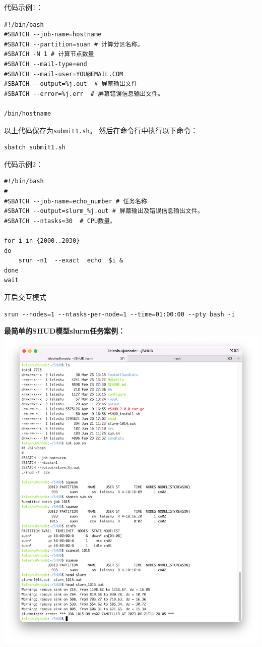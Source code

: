 \documentclass[
]{ctexbook}
\begin{document}
代码示例1：

\begin{verbatim}
#!/bin/bash
#SBATCH --job-name=hostname
#SBATCH --partition=suan # 计算分区名称。
#SBATCH -N 1 # 计算节点数量
#SBATCH --mail-type=end  
#SBATCH --mail-user=YOU@EMAIL.COM
#SBATCH --output=%j.out  # 屏幕输出文件
#SBATCH --error=%j.err  # 屏幕错误信息输出文件。

/bin/hostname
\end{verbatim}

以上代码保存为\texttt{submit1.sh}。 然后在命令行中执行以下命令：

\begin{verbatim}
sbatch submit1.sh
\end{verbatim}

代码示例2：

\begin{verbatim}
#!/bin/bash
#
#SBATCH --job-name=echo_number # 任务名称
#SBATCH --output=slurm_%j.out # 屏幕输出及错误信息输出文件。
#SBATCH --ntasks=30  # CPU数量。

for i in {2000..2030}
do
    srun -n1  --exact  echo  $i &
done
wait
\end{verbatim}

开启交互模式

\begin{verbatim}
srun --nodes=1 --ntasks-per-node=1 --time=01:00:00 --pty bash -i
\end{verbatim}

\textbf{最简单的SHUD模型slurm任务案例：}
\includegraphics{Fig/ch5/slurm_example.png}
\end{document}
